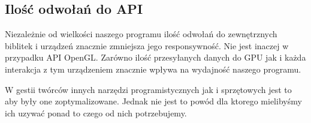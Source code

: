 \subsection{Ilość odwołań do API}
\thispagestyle{empty}
\par\indent

Niezależnie od wielkości naszego programu ilość odwołań do zewnętrznych biblitek i urządzeń znacznie zmniejsza jego responsywność. Nie jest inaczej w przypadku API OpenGL. Zarówno ilość przesyłanych danych do GPU jak i każda interakcja z tym urządzeniem znacznie wpływa na wydajność naszego programu.

W gestii twórców innych narzędzi programistycznych jak i sprzętowych jest to aby były one zoptymalizowane. Jednak nie jest to powód dla ktorego mielibyśmy ich uzywać ponad to czego od nich potrzebujemy.

